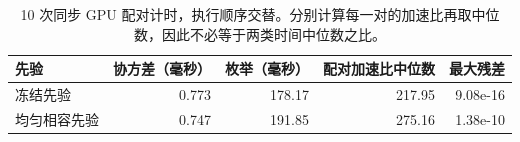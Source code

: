 \begin{table}[tbp]
\centering
\caption{10 次同步 GPU 配对计时，执行顺序交替。分别计算每一对的加速比再取中位数，因此不必等于两类时间中位数之比。}
\label{tab:timing}
\scriptsize
\setlength{\tabcolsep}{3pt}
\begin{tabular}{lrrrr}
\toprule
先验 & 协方差（毫秒） & 枚举（毫秒） & 配对加速比中位数 & 最大残差 \\
\midrule
冻结先验 & 0.773 & 178.17 & 217.95 & 9.08e-16 \\
均匀相容先验 & 0.747 & 191.85 & 275.16 & 1.38e-10 \\
\bottomrule
\end{tabular}
\end{table}
